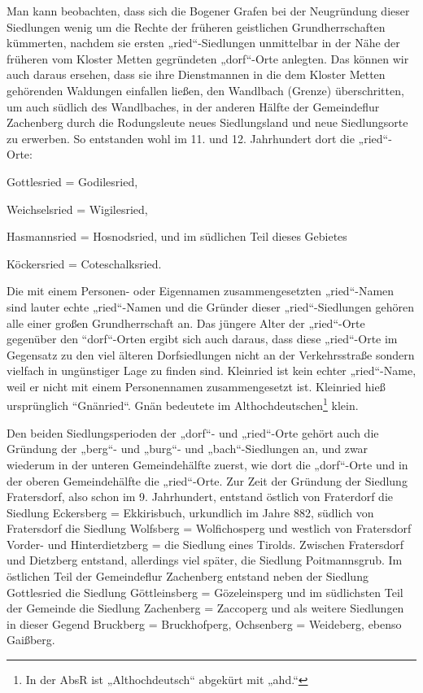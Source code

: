 \documentclass{book}
\begin{document}
Man kann beobachten, dass sich die Bogener Grafen bei der Neugründung
dieser Siedlungen wenig um die Rechte der früheren geistlichen
Grundherrschaften kümmerten, nachdem sie ersten „ried“-Siedlungen
unmittelbar in der Nähe der früheren vom Kloster Metten gegründeten
„dorf“-Orte anlegten. Das können wir auch daraus ersehen, dass sie ihre
Dienstmannen in die dem Kloster Metten gehörenden Waldungen einfallen
ließen, den Wandlbach (Grenze) überschritten, um auch südlich des
Wandlbaches, in der anderen Hälfte der Gemeindeflur Zachenberg durch die
Rodungsleute neues Siedlungsland und neue Siedlungsorte zu erwerben. So
entstanden wohl im 11. und 12. Jahrhundert dort die „ried“-Orte:

Gottlesried = Godilesried,

Weichselsried = Wigilesried,

Hasmannsried = Hosnodsried, und im südlichen Teil dieses Gebietes

Köckersried = Coteschalksried.

Die mit einem Personen- oder Eigennamen zusammengesetzten „ried“-Namen
sind lauter echte „ried“-Namen und die Gründer dieser „ried“-Siedlungen
gehören alle einer großen Grundherrschaft an. Das jüngere Alter der
„ried“-Orte gegenüber den “dorf“-Orten ergibt sich auch daraus, dass
diese „ried“-Orte im Gegensatz zu den viel älteren Dorfsiedlungen nicht
an der Verkehrsstraße sondern vielfach in ungünstiger Lage zu finden
sind. Kleinried ist kein echter „ried“-Name, weil er nicht mit einem
Personennamen zusammengesetzt ist. Kleinried hieß ursprünglich
“Gnänried“. Gnän bedeutete im Althochdeutschen\footnote{In der AbsR ist
„Althochdeutsch“ abgekürt mit „ahd.“} klein.

Den beiden Siedlungsperioden der „dorf“- und „ried“-Orte gehört auch die
Gründung der „berg“- und „burg“- und „bach“-Siedlungen an, und zwar
wiederum in der unteren Gemeindehälfte zuerst, wie dort die „dorf“-Orte
und in der oberen Gemeindehälfte die „ried“-Orte. Zur Zeit der Gründung
der Siedlung Fratersdorf, also schon im 9. Jahrhundert, entstand östlich
von Fraterdorf die Siedlung Eckersberg = Ekkirisbuch, urkundlich im
Jahre 882, südlich von Fratersdorf die Siedlung Wolfsberg =
Wolfichosperg und westlich von Fratersdorf Vorder- und Hinterdietzberg =
die Siedlung eines Tirolds. Zwischen Fratersdorf und Dietzberg entstand,
allerdings viel später, die Siedlung Poitmannsgrub. Im östlichen Teil
der Gemeindeflur Zachenberg entstand neben der Siedlung Gottlesried die
Siedlung Göttleinsberg = Gözeleinsperg und im südlichsten Teil der
Gemeinde die Siedlung Zachenberg = Zaccoperg und als weitere Siedlungen
in dieser Gegend Bruckberg = Bruckhofperg, Ochsenberg = Weideberg,
ebenso Gaißberg.
\end{document}
